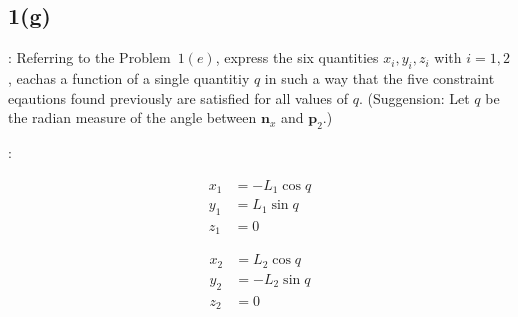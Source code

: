 \subsection{1(g)}
: Referring to the Problem~$1(e)$, express the six quantities $x_i, y_i, z_i$ with $i=1,2$, eachas a function of a single quantitiy $q$ in such a way that the five constraint eqautions found previously are satisfied for all values of $q$. (Suggension: Let $q$ be the radian measure of the angle between $\pmb n_x$ and $\pmb p_2$.)

:

\begin{multicols}{2}
\begin{align*}
    x_1 &= -L_1 \cos q\\
    y_1 &= L_1 \sin q\\
    z_1 &=  0
\end{align*}

\begin{align*}
    x_2 &= L_2 \cos q\\
    y_2 &= -L_2 \sin q\\
    z_2 &=  0
\end{align*}
\end{multicols}
